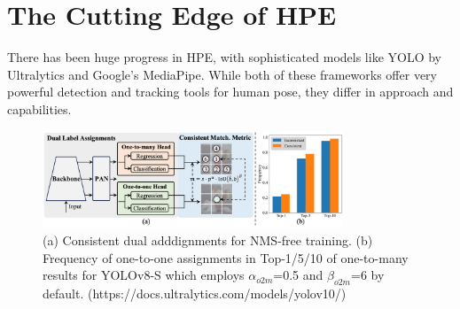 \section{The Cutting Edge of HPE}
    There has been huge progress in HPE, with sophisticated models like YOLO  by Ultralytics and Google's MediaPipe. While both of these frameworks offer very powerful detection and tracking tools for human pose, they differ in approach and capabilities. 
    \begin{figure}[htbp]
        \centering
        \includegraphics[width=0.8\textwidth]{figures/yolov10arch.png}
        \caption{(a) Consistent dual adddignments for NMS-free training. (b) Frequency of one-to-one assignments in Top-1/5/10 of one-to-many results for YOLOv8-S which employs $\alpha_{o2m}$=0.5 and $\beta_{o2m}$=6 by default. (https://docs.ultralytics.com/models/yolov10/)}
        \label{fig:yolo_arch}
    \end{figure}
